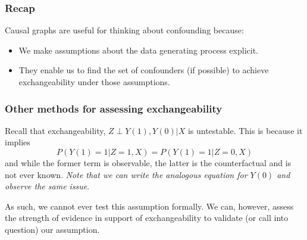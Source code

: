 \subsubsection{Recap}
Causal graphs are useful for thinking about confounding because:
\begin{itemize}
    \item We make assumptions about the data generating process explicit.
    \item They enable us to find the set of confounders (if possible) to achieve exchangeability under those assumptions.
\end{itemize}

\subsubsection{Other methods for assessing exchangeability}

Recall that exchangeability, $Z \perp Y(1), Y(0) | X$ is untestable. This is because it implies
$$P(Y(1)=1|Z=1,X) = P(Y(1)=1|Z=0,X)$$
and while the former term is observable, the latter is the counterfactual and is not ever known. \textit{Note that we can write the analogous equation for $Y(0)$ and observe the same issue}. 

As such, we cannot ever test this assumption formally. We can, however, assess the strength of evidence in support of exchangeability to validate (or call into question) our assumption.

